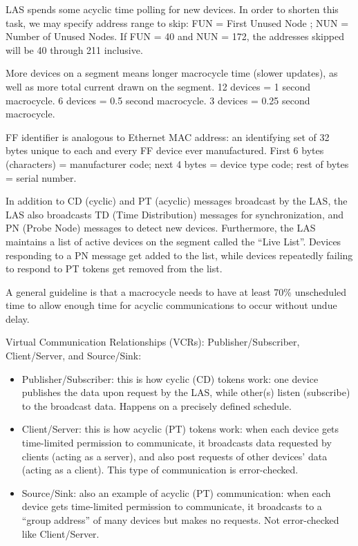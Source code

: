 LAS spends some acyclic time polling for new devices.  In order to shorten this task, we may specify address range to skip: FUN = First Unused Node ; NUN = Number of Unused Nodes.  If FUN = 40 and NUN = 172, the addresses skipped will be 40 through 211 inclusive.

More devices on a segment means longer macrocycle time (slower updates), as well as more total current drawn on the segment.  12 devices = 1 second macrocycle.  6 devices = 0.5 second macrocycle.  3 devices = 0.25 second macrocycle.

FF identifier is analogous to Ethernet MAC address: an identifying set of 32 bytes unique to each and every FF device ever manufactured.  First 6 bytes (characters) = manufacturer code; next 4 bytes = device type code; rest of bytes = serial number.

\vskip 10pt

In addition to CD (cyclic) and PT (acyclic) messages broadcast by the LAS, the LAS also broadcasts TD (Time Distribution) messages for synchronization, and PN (Probe Node) messages to detect new devices.  Furthermore, the LAS maintains a list of active devices on the segment called the ``Live List''.  Devices responding to a PN message get added to the list, while devices repeatedly failing to respond to PT tokens get removed from the list.

A general guideline is that a macrocycle needs to have at least 70\% unscheduled time to allow enough time for acyclic communications to occur without undue delay.

\vskip 10pt

Virtual Communication Relationships (VCRs): Publisher/Subscriber, Client/Server, and Source/Sink:

\begin{itemize}
\item{} Publisher/Subscriber: this is how cyclic (CD) tokens work: one device publishes the data upon request by the LAS, while other(s) listen (subscribe) to the broadcast data.  Happens on a precisely defined schedule.
\item{} Client/Server: this is how acyclic (PT) tokens work: when each device gets time-limited permission to communicate, it broadcasts data requested by clients (acting as a server), and also post requests of other devices' data (acting as a client).  This type of communication is error-checked.
\item{} Source/Sink: also an example of acyclic (PT) communication: when each device gets time-limited permission to communicate, it broadcasts to a ``group address'' of many devices but makes no requests.  Not error-checked like Client/Server.
\end{itemize}

